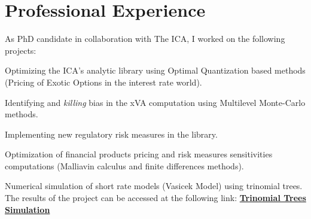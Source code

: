 \documentclass[]{deedy-resume-openfont}
\begin{document}
\begin{minipage}[t]{0.64\textwidth}
	\section{Professional Experience}

	As PhD candidate in collaboration with The ICA, I worked on the following projects:
	\begin{tightemize}
		\item Optimizing the ICA's analytic library using Optimal Quantization based methods (Pricing of Exotic Options in the interest rate world).
		\item Identifying and \textit{killing} bias in the xVA computation using Multilevel Monte-Carlo methods.
		\item Implementing new regulatory risk measures in the library.
	\end{tightemize}

	\sectionsep

	Optimization of financial products pricing and risk measures sensitivities computations (Malliavin calculus and finite differences methods).
	\sectionsep

	Numerical simulation of short rate models (Vasicek Model) using trinomial trees. The results of the project can be accessed at the following link: \href{http://simulations.lpsm.paris/trinomial_trees/}{\bf Trinomial Trees Simulation}
	\sectionsep

\end{minipage}

\nocite{*}


\end{document}
